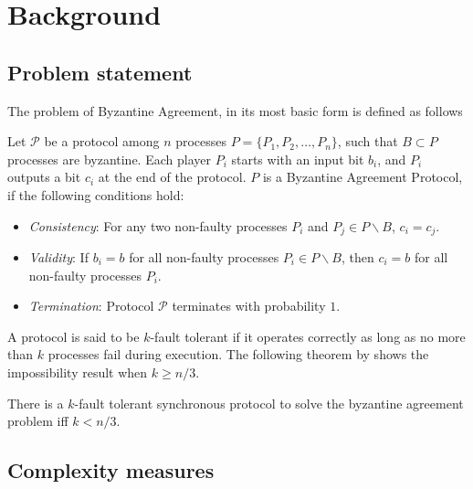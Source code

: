 ﻿\section{Background}
\label{sec:background}

\subsection{Problem statement}
The problem of Byzantine Agreement, in its most basic form is defined as follows

\begin{definition}
Let $\mathcal{P}$ be a protocol among $n$ processes $P = \{ P_1, P_2, \dots, P_n\}$, such that $B \subset P$ processes are byzantine. Each player $P_i$ starts with an input bit $b_i$, and $P_i$ outputs a bit $c_i$ at the end of the protocol. $P$ is a Byzantine Agreement Protocol, if the following conditions hold:
\begin{itemize}
    \item \textit{Consistency}: For any two non-faulty processes $P_i$ and $P_j \in P \backslash B$, $c_i = c_j$.
    \item \textit{Validity}: If $b_i = b$ for all non-faulty processes $P_i \in P \backslash B$, then $c_i = b$ for all non-faulty processes $P_i$.
    \item \textit{Termination}: Protocol $\mathcal{P}$ terminates with probability $1$.
\end{itemize}
\end{definition}

A protocol is said to be $k$-fault tolerant if it operates correctly as long as no more than $k$ processes fail during execution. The following theorem by \cite{LamportSP82,PeaseSL80} shows the impossibility result when $k \geq n/3$.

\begin{theorem}
There is a $k$-fault tolerant synchronous protocol to solve the byzantine agreement problem iff $k < n/3$.
\end{theorem}

\subsection{Complexity measures}

